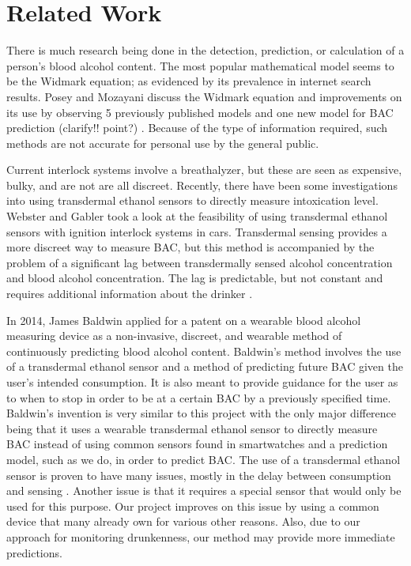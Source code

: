 \section{Related Work}

There is much research being done in the detection, prediction, or calculation of a person's blood alcohol content. The most popular mathematical model seems to be the Widmark equation; as evidenced by its prevalence in internet search results. Posey and Mozayani discuss the Widmark equation and improvements on its use by observing 5 previously published models and one new model for BAC prediction (clarify!! point?) \cite{Posey:2007}. Because of the type of information required, such methods are not accurate for personal use by the general public.

Current interlock systems involve a breathalyzer, but these are seen as expensive, bulky, and are not are all discreet. Recently, there have been some investigations into using transdermal ethanol sensors to directly measure intoxication level. Webster and Gabler took a look at the feasibility of using transdermal ethanol sensors with ignition interlock systems in cars. Transdermal sensing provides a more discreet way to measure BAC, but this method is accompanied by the problem of a significant lag between transdermally sensed alcohol concentration and blood alcohol concentration. The lag is predictable, but not constant and requires additional information about the drinker \cite{Webster:2007}.

In 2014, James Baldwin applied for a patent on a wearable blood alcohol measuring device \cite{Baldwin:2014} as a non-invasive, discreet, and wearable method of continuously predicting blood alcohol content. Baldwin's method involves the use of a transdermal ethanol sensor and a method of predicting future BAC given the user's intended consumption. It is also meant to provide guidance for the user as to when to stop in order to be at a certain BAC by a previously specified time. Baldwin's invention is very similar to this project with the only major difference being that it uses a wearable transdermal ethanol sensor to directly measure BAC instead of using common sensors found in smartwatches and a prediction model, such as we do, in order to predict BAC. The use of a transdermal ethanol sensor is proven to have many issues, mostly in the delay between consumption and sensing \cite{Webster:2007}. Another issue is that it requires a special sensor that would only be used for this purpose. Our project improves on this issue by using a common device that many already own for various other reasons. Also, due to our approach for monitoring drunkenness, our method may provide more immediate predictions.  

